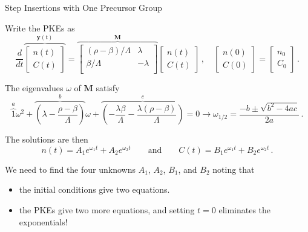 \documentclass[aspectratio=1610]{beamer}
\begin{document}
\begin{frame}[fragile]{Step Insertions with One Precursor Group}
 
{\small

Write the PKEs as
\begin{equation*}
 \frac{d}{dt}  
   \overbrace{\left [ 
     \begin{array}{c} n(t) \\ 
                      C(t) 
      \end{array} \right ]}^{\mathbf{y}(t)}
 =
   \overbrace{\left [ \begin{array}{cc}
       (\rho-\beta)/\Lambda    & \lambda \\
       \beta /\Lambda          & -\lambda \\
   \end{array} \right ]}^{\mathbf{M}} 
   \left [ \begin{array}{c} n(t) \\ C(t) \end{array} \right ] \, , \quad \left [ 
     \begin{array}{c} n(0) \\ 
                      C(0) 
      \end{array} \right ] = \left [ 
     \begin{array}{c} n_0 \\ 
                      C_0
      \end{array} \right ] \, .
\end{equation*}

The eigenvalues $\omega$ of $\mathbf{M}$ satisfy
\begin{equation*}
 \overbrace{1}^{a} \omega^2 + 
           \overbrace{\left (\lambda - \frac{\rho - \beta}{\Lambda} \right )}^{b} \omega + 
            \overbrace{\left ( -\frac{\lambda \beta}{\Lambda} -\frac{\lambda(\rho - \beta)}{\Lambda} \right )}^{c} = 0  \longrightarrow \boxed{\omega_{1/2} = \frac{-b\pm \sqrt{b^2 - 4ac}}{2a}} \, .
\end{equation*}

The solutions are then
\begin{equation*}
  n(t) = A_1 e^{\omega_1 t} + A_2 e^{\omega_2 t} \qquad \text{and} \qquad 
  C(t) = B_1 e^{\omega_1 t} + B_2 e^{\omega_2 t} \, .
\end{equation*}

We need to find the four unknowns $A_1$, $A_2$, $B_1$, and $B_2$ noting that
\begin{itemize}
 \item the initial conditions give two equations.
 \item the PKEs give two more equations, and setting $t = 0$ eliminates the exponentials!
\end{itemize}

}
 
\end{frame}
\end{document}
